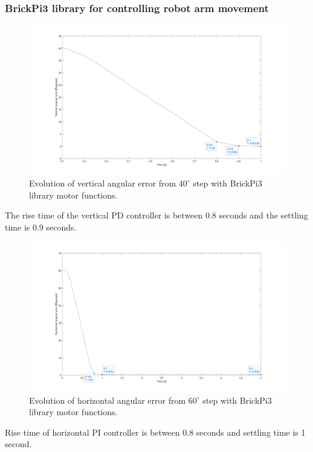 \subsubsection{BrickPi3 library for controlling robot arm movement}
\begin{figure}[H]
\centering
\includegraphics[width=\textwidth]{assets/Vertical_built_in_functions.png}
\caption{Evolution of vertical angular error from \(40^{\circ}\) step with BrickPi3 library motor functions.}
\label{vert_P}
\end{figure}
The rise time of the vertical PD controller is between 0.8 seconds and the settling time is 0.9 seconds.
\begin{figure}[H]
\centering
\includegraphics[width=\textwidth]{assets/Horizontal_built_in_funtion.png}
\caption{Evolution of horizontal angular error from \(60^{\circ}\) step with BrickPi3 library motor functions.}
\label{vert_P}
\end{figure}
Rise time of horizontal PI controller is between 0.8 seconds and settling time is 1 second.

